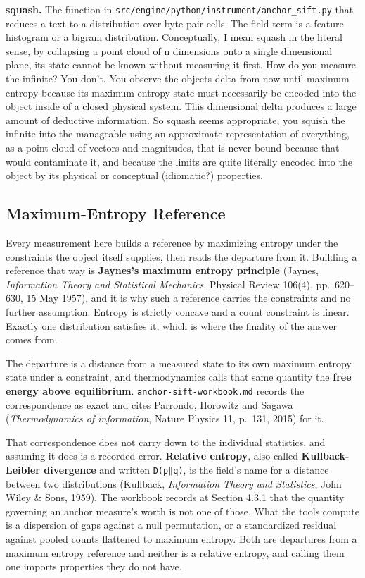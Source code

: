 \noindent\textbf{squash.} The function in \texttt{src/\allowbreak{}engine/\allowbreak{}python/\allowbreak{}instrument/\allowbreak{}anchor\_\allowbreak{}sift.\allowbreak{}py} that reduces a text to a distribution over byte-pair cells. The field term is a feature histogram or a bigram distribution. Conceptually, I mean squash in the literal sense, by collapsing a point cloud of n dimensions onto a single dimensional plane, its state cannot be known without measuring it first. How do you measure the infinite? You don't. You observe the objects delta from now until maximum entropy because its maximum entropy state must necessarily be encoded into the object inside of a closed physical system. This dimensional delta produces a large amount of deductive information. So squash seems appropriate, you squish the infinite into the manageable using an approximate representation of everything, as a point cloud of vectors and magnitudes, that is never bound because that would contaminate it, and because the limits are quite literally encoded into the object by its physical or conceptual (idiomatic?) properties.

\subsection{Maximum-Entropy Reference}

Every measurement here builds a reference by maximizing entropy under the constraints the object itself supplies, then reads the departure from it. Building a reference that way is \textbf{Jaynes's maximum entropy principle} (Jaynes, \emph{Information Theory and Statistical Mechanics}, Physical Review 106(4), pp.~620--630, 15 May 1957), and it is why such a reference carries the constraints and no further assumption. Entropy is strictly concave and a count constraint is linear. Exactly one distribution satisfies it, which is where the finality of the answer comes from.

The departure is a distance from a measured state to its own maximum entropy state under a constraint, and thermodynamics calls that same quantity the \textbf{free energy above equilibrium}. \texttt{anchor-\allowbreak{}sift-\allowbreak{}workbook.\allowbreak{}md} records the correspondence as exact and cites Parrondo, Horowitz and Sagawa (\emph{Thermodynamics of information}, Nature Physics 11, p.~131, 2015) for it.

That correspondence does not carry down to the individual statistics, and assuming it does is a recorded error. \textbf{Relative entropy}, also called \textbf{Kullback-Leibler divergence} and written \texttt{D(p‖q)}, is the field's name for a distance between two distributions (Kullback, \emph{Information Theory and Statistics}, John Wiley \& Sons, 1959). The workbook records at Section 4.3.1 that the quantity governing an anchor measure's worth is not one of those. What the tools compute is a dispersion of gaps against a null permutation, or a standardized residual against pooled counts flattened to maximum entropy. Both are departures from a maximum entropy reference and neither is a relative entropy, and calling them one imports properties they do not have.

